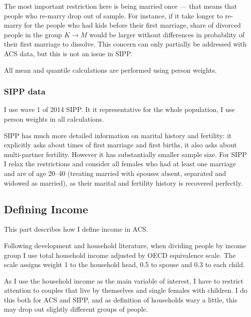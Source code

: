 \documentclass[12pt,letter]{article}
\begin{document}
The most important restriction here is being married once --- that means that people who re-marry drop out of sample. For instance, if it take longer to re-marry for the people who had kids before their first marriage, share of divorced people in the group $K\to M$ would be larger without differences in probability of their first marriage to dissolve. This concern can only partially be addressed with ACS data, but this is not an issue in SIPP. 


All mean and quantile calculations are performed using person weights.

\subsubsection{SIPP data}

I use wave 1 of 2014 SIPP. It it representative for the whole population, I use person weights in all calculations.

SIPP has much more detailed information on marital history and fertility: it explicitly asks about times of first marriage and first births, it also asks about multi-partner fertility. However it has substantially smaller sample size. For SIPP I relax the restrictions and consider all females who had at least one marriage and are of age 20--40 (treating married with spouses absent, separated and widowed as married), as their marital and fertility history is recovered perfectly.


\subsection{Defining Income}
This part describes how I define income in ACS.



Following development and household literature, when dividing people by income group I use total household income adjusted by OECD equivalence scale. The scale assigns weight 1 to the household head, 0.5 to spouse and 0.3 to each child.

As I use the household income as the main variable of interest, I have to restrict attention to couples that live by themselves and single females with children. I do this both for ACS and SIPP, and as definition of households wary a little, this may drop out slightly different groups of people.
\end{document}
